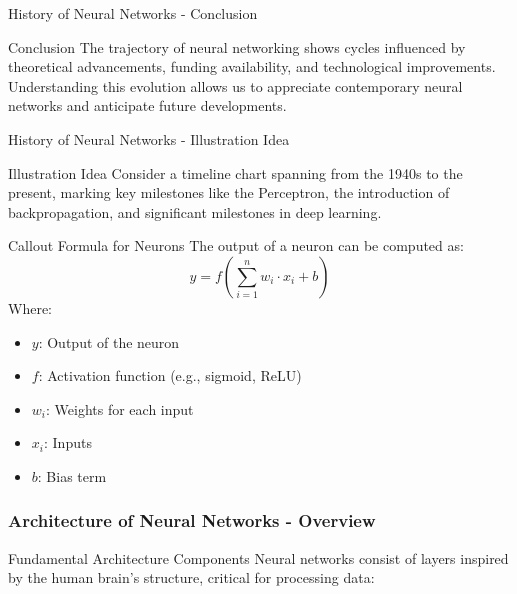 \documentclass[aspectratio=169]{beamer}
\begin{document}
\begin{frame}[fragile]{History of Neural Networks - Conclusion}
    \begin{block}{Conclusion}
        The trajectory of neural networking shows cycles influenced by theoretical advancements, funding availability, and technological improvements. Understanding this evolution allows us to appreciate contemporary neural networks and anticipate future developments.
    \end{block}
\end{frame}

\begin{frame}[fragile]{History of Neural Networks - Illustration Idea}
    \begin{block}{Illustration Idea}
        Consider a timeline chart spanning from the 1940s to the present, marking key milestones like the Perceptron, the introduction of backpropagation, and significant milestones in deep learning.
    \end{block}
\end{frame}

\begin{frame}[fragile]{Callout Formula for Neurons}
    The output of a neuron can be computed as:  
    \begin{equation}
        y = f\left(\sum_{i=1}^{n} w_i \cdot x_i + b\right)
    \end{equation}
    Where:
    \begin{itemize}
        \item \(y\): Output of the neuron
        \item \(f\): Activation function (e.g., sigmoid, ReLU)
        \item \(w_i\): Weights for each input
        \item \(x_i\): Inputs
        \item \(b\): Bias term
    \end{itemize}
\end{frame}

\begin{frame}[fragile]
    \frametitle{Architecture of Neural Networks - Overview}
    \begin{block}{Fundamental Architecture Components}
        Neural networks consist of layers inspired by the human brain's structure, critical for processing data:
    \end{block}
\end{frame}
\end{document}

